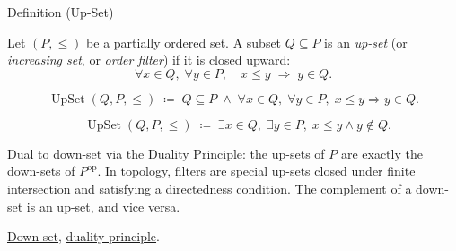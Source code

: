 \begin{definitionbox}{Definition (Up-Set)}
\begin{definition}[Up-Set]
\label{def:up-set}
Let $(P, \leq)$ be a partially ordered set.  A subset $Q \subseteq P$ is
an \emph{up-set} (or \emph{increasing set}, or \emph{order filter}) if it
is closed upward:
\[
\forall x \in Q,\; \forall y \in P,\quad x \leq y \;\Longrightarrow\; y \in Q.
\]
\end{definition}
\end{definitionbox}

\begin{remark*}
\[
\operatorname{UpSet}(Q, P, \leq)
\;\coloneqq\;
Q \subseteq P
\;\land\;
\forall x \in Q,\; \forall y \in P,\;
x \leq y \Rightarrow y \in Q.
\]
\end{remark*}

\begin{remark*}
\[
\neg\operatorname{UpSet}(Q, P, \leq)
\;\coloneqq\;
\exists x \in Q,\; \exists y \in P,\;
x \leq y \land y \notin Q.
\]
\end{remark*}

\begin{remark*}[Interpretation]
Dual to down-set via the
\hyperref[prop:duality-principle]{Duality Principle}: the up-sets of $P$
are exactly the down-sets of $P^{\mathrm{op}}$.  In topology, filters are
special up-sets closed under finite intersection and satisfying a
directedness condition.  The complement of a down-set is an up-set, and
vice versa.
\end{remark*}

\begin{remark*}[Dependencies]
\hyperref[def:down-set]{Down-set},
\hyperref[prop:duality-principle]{duality principle}.
\end{remark*}
